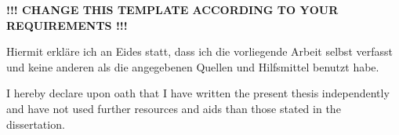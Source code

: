 %
%
\color{red}
\begin{center}
\bf !!! CHANGE THIS TEMPLATE ACCORDING TO YOUR REQUIREMENTS !!!
\end{center}
%
%
\par\noindent Hiermit erkläre ich an Eides statt, dass ich die vorliegende Arbeit selbst verfasst und keine anderen als die angegebenen Quellen und Hilfsmittel benutzt habe.
%
\vspace*{2em}%
%
\par\noindent I hereby declare upon oath that I have written the present thesis independently and have not used further resources and aids than those stated in the dissertation.
%
